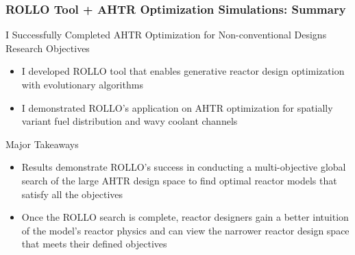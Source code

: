 \begin{frame}
    \frametitle{ROLLO Tool + AHTR Optimization Simulations: Summary}
    \begin{block}{I Successfully Completed AHTR Optimization for Non-conventional Designs
    Research Objectives}
    \begin{itemize}
        \item I developed \acrfull{ROLLO} tool that enables generative reactor design
        optimization with evolutionary algorithms 
        \item I demonstrated ROLLO's application on AHTR optimization for spatially variant 
        fuel distribution and wavy coolant channels
    \end{itemize}    
    \end{block}
    \begin{block}{Major Takeaways}
        \begin{itemize}
            \item Results demonstrate ROLLO's success in conducting a multi-objective 
            global search of the large AHTR design space to find optimal reactor models 
            that satisfy all the objectives
            \item Once the ROLLO search is complete, reactor designers gain a better 
            intuition of the model's reactor physics and can view the narrower reactor 
            design space that meets their defined objectives
        \end{itemize}
    \end{block}
\end{frame}